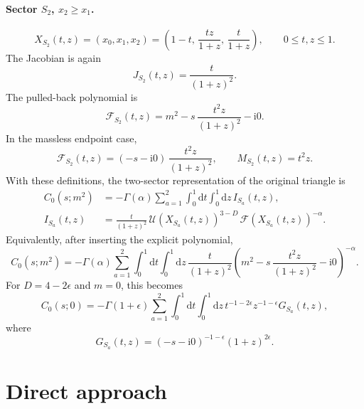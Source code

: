 \documentclass[11pt]{article}
\newcommand{\dd}{\mathrm d}
\newcommand{\ii}{\mathrm i}
\newcommand{\eps}{\epsilon}
\newcommand{\U}{\mathcal U}
\newcommand{\F}{\mathcal F}
\begin{document}
\paragraph{Sector \(S_2\), \(x_2\geq x_1\).}
\begin{equation}
  X_{S_2}(t,z)
  =
  (x_0,x_1,x_2)
  =
  \left(
    1-t,\,
    \frac{tz}{1+z},\,
    \frac{t}{1+z}
  \right),
  \qquad
  0\leq t,z\leq 1 .
\end{equation}
The Jacobian is again
\begin{equation}
  J_{S_2}(t,z)=\frac{t}{(1+z)^2}.
\end{equation}
The pulled-back polynomial is
\begin{equation}
  \F_{S_2}(t,z)
  =
  m^2
  -
  s\,\frac{t^2z}{(1+z)^2}
  -
  \ii0 .
\end{equation}
In the massless endpoint case,
\begin{equation}
  \F_{S_2}(t,z)
  =
  (-s-\ii0)\,\frac{t^2z}{(1+z)^2},
  \qquad
  M_{S_2}(t,z)=t^2z .
\end{equation}
With these definitions, the two-sector representation of the original
triangle is
\begin{align}
  C_0(s;m^2)
  &=
  -\Gamma(\alpha)
  \sum_{a=1}^{2}
  \int_0^1\dd t
  \int_0^1\dd z\,
  I_{S_a}(t,z),
  \\
  I_{S_a}(t,z)
  &=
  \frac{t}{(1+z)^2}\,
  \U(X_{S_a}(t,z))^{3-D}\,
  \F(X_{S_a}(t,z))^{-\alpha}.
\end{align}
Equivalently, after inserting the explicit polynomial,
\begin{equation}
  C_0(s;m^2)
  =
  -\Gamma(\alpha)
  \sum_{a=1}^{2}
  \int_0^1\dd t
  \int_0^1\dd z\,
  \frac{t}{(1+z)^2}
  \left(
    m^2
    -
    s\,\frac{t^2z}{(1+z)^2}
    -
    \ii0
  \right)^{-\alpha}.
\end{equation}
For \(D=4-2\eps\) and \(m=0\), this becomes
\begin{equation}
  C_0(s;0)
  =
  -\Gamma(1+\eps)
  \sum_{a=1}^{2}
  \int_0^1\dd t
  \int_0^1\dd z\,
  t^{-1-2\eps}
  z^{-1-\eps}
  G_{S_a}(t,z),
\end{equation}
where
\begin{equation}
  G_{S_a}(t,z)
  =
  (-s-\ii0)^{-1-\eps}(1+z)^{2\eps}.
\end{equation}

\section{Direct approach}
\end{document}
